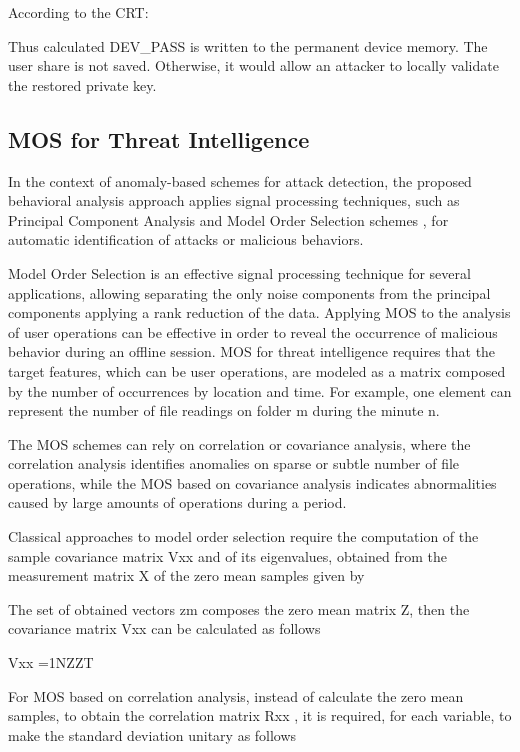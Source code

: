 \documentclass[twocolumn]{svjour3}          %
\begin{document}
According to the CRT:

Thus calculated DEV\_PASS is written to the permanent device memory. The user share is not saved. Otherwise, it would allow an attacker to locally validate the restored private key.

\subsection{MOS for Threat Intelligence}
\label{sec_mos}
In the context of anomaly-based schemes for attack detection, the proposed behavioral analysis approach applies signal processing techniques, such as Principal Component Analysis and Model Order Selection schemes \cite{tenorio2013greatest}, for automatic identification of attacks or malicious behaviors. 

Model Order Selection is an effective signal processing technique for several applications, allowing separating the only noise components from the principal components applying a rank reduction of the data. Applying MOS to the analysis of user operations can be effective in order to reveal the occurrence of malicious behavior during an offline session. MOS for threat intelligence requires that the target features, which can be user operations, are modeled as a matrix composed by the number of occurrences by location and time. For example, one element can represent the number of file readings on folder m during the minute n.

The MOS schemes can rely on correlation or covariance analysis, where the correlation analysis identifies anomalies on sparse or subtle number of file operations, while the MOS based on covariance analysis indicates abnormalities caused by large amounts of operations during a period.

Classical approaches to model order selection require the computation of the sample covariance matrix Vxx and of its eigenvalues, obtained from the measurement matrix X of the zero mean samples given by



The set of obtained vectors zm composes the zero mean matrix Z, then the covariance matrix Vxx can be calculated as follows 

Vxx =1NZZT

For MOS based on correlation analysis, instead of calculate the zero mean samples, to obtain the correlation matrix Rxx , it is required, for each variable, to make the standard deviation unitary as follows
\end{document}
